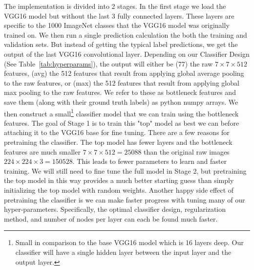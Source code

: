 \documentclass[12pt,journal,compsoc]{IEEEtran}
\begin{document}

The implementation is divided into 2 stages. In the first stage we load the VGG16 model but without the last 3 fully connected layers. These layers are specific to the 1000 ImageNet classes that the VGG16 model was originally trained on. We then run a single prediction calculation the both the training and validation sets. But instead of getting the typical label predictions, we get the output of the last VGG16 convolutional layer. Depending on our Classifier Design (See Table~\ref{tab:hyperparams}), the output will either be (77) the raw $7\times7\times512$ features, (avg) the 512 features that result from applying global average pooling to the raw features, or (max) the 512 features that result from applying global max pooling to the raw features. We refer to these as bottleneck features and save them (along with their ground truth labels) as python numpy arrays. We then construct a small\footnote{Small in comparison to the base VGG16 model which is 16 layers deep. Our classifier will have a single hidden layer between the input layer and the output layer.} classifier model that we can train using the bottleneck features. The goal of Stage 1 is to train this "top" model as best we can before attaching it to the VGG16 base for fine tuning. There are a few reasons for pretraining the classifier. The top model has fewer layers and the bottleneck features are much smaller $7\times7\times512=25088$ than the original raw images $224\times224\times3=150528$. This leads to fewer parameters to learn and faster training. We will still need to fine tune the full model in Stage 2, but pretraining the top model in this way provides a much better starting guess than simply initializing the top model with random weights. Another happy side effect of pretraining the classifier is we can make faster progress with tuning many of our hyper-parameters. Specifically, the optimal classifier design, regularization method, and number of nodes per layer can each be found much faster.
\end{document}
